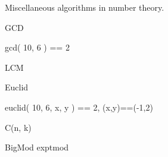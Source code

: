 
Miscellaneous algorithms in number theory.

\begin{algorithm}{GCD}
\characteristics{}
\begin{example}
	gcd( 10, 6 ) == 2
\end{example}
\end{algorithm}

\begin{algorithm}{LCM}
\end{algorithm}


\begin{algorithm}{Euclid}
\begin{example}
	euclid( 10, 6, x, y ) == 2, (x,y)==(-1,2)
\end{example}
\end{algorithm}

\begin{algorithm}{C(n, k)}
\end{algorithm}

\begin{algorithm}{BigMod exptmod}
\end{algorithm}

\begin{sources}
\end{sources}
